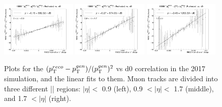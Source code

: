 \begin{figure}[!htb]
      \centering
      \captionsetup{justification=justified}
      \includegraphics[width=0.32\textwidth]{pics/muon_corr/GeoFit/fit_results/2017_DY_eta_0_0p9_dRelPt2p0_Roch.png}
      \includegraphics[width=0.32\textwidth]{pics/muon_corr/GeoFit/fit_results/2017_DY_eta_0p9_1p7_dRelPt2p0_Roch.png}
      \includegraphics[width=0.32\textwidth]{pics/muon_corr/GeoFit/fit_results/2017_DY_eta_1p7_inf_dRelPt2p0_Roch.png}
      \caption{Plots for the $(p_{\mathrm{T}}^{reco}-p_{\mathrm{T}}^{gen})/ (p_{\mathrm{T}}^{gen})^{2}$ vs d0 correlation in the 2017 \DY simulation, 
               and the linear fits to them. Muon tracks are divided into three different |\eta| regions:
               $|\eta| <$ 0.9 (left), 0.9 $< |\eta| <$ 1.7 (middle), and 1.7 $< |\eta|$ (right).
               }
      \label{fig:geofit_param_2017}
\end{figure}


